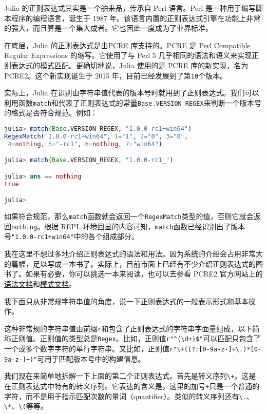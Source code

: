 Julia 的正则表达式其实是一个舶来品，传承自 Perl 语言。Perl 是一种用于编写脚本程序的编程语言，诞生于 1987 年。该语言内置的正则表达式引擎在功能上非常的强大，而且算是一个集大成者。它也因此一度成为了业界标准。

在底层，Julia 的正则表达式是由\href{https://www.pcre.org}{PCRE 库}支持的。PCRE 是 Perl Compatible Regular Expressions 的缩写。它使用了与 Perl 5 几乎相同的语法和语义来实现正则表达式的模式匹配。更确切地说，Julia 使用的是 PCRE 库的新实现，名为 PCRE2。这个新实现诞生于 2015 年，目前已经发展到了第\verb`10`个版本。

实际上，Julia 在识别由字符串值代表的版本号时就用到了正则表达式。我们可以利用函数\verb`match`和代表了正则表达式的常量\verb`Base.VERSION_REGEX`来判断一个版本号的格式是否符合规范。例如：
\begin{lstlisting}[language=julia]
julia> match(Base.VERSION_REGEX, "1.0.0-rc1+win64")
RegexMatch("1.0.0-rc1+win64", 1="1", 2="0", 3="0",
 4=nothing, 5="-rc1", 6=nothing, 7="win64")

julia> match(Base.VERSION_REGEX, "1.0.0-rc1_")

julia> ans == nothing
true

julia> 
\end{lstlisting}

如果符合规范，那么\verb`match`函数就会返回一个\verb`RegexMatch`类型的值，否则它就会返回\verb`nothing`。根据 REPL 环境回显的内容可知，\verb`match`函数已经识别出了版本号\verb`"1.0.0-rc1+win64"`中的各个组成部分。

我在这里不想过多地介绍正则表达式的语法和用法。因为系统的介绍会占用非常大的篇幅，足以写成一本书了。实际上，目前市面上已经有不少介绍正则表达式的图书了。如果有必要，你可以挑选一本来阅读，也可以去参看 PCRE2 官方网站上的\href{https://www.pcre.org/current/doc/html/pcre2syntax.html}{语法文档}和\href{https://www.pcre.org/current/doc/html/pcre2pattern.html}{模式文档}。

我下面只从非常规字符串值的角度，说一下正则表达式的一般表示形式和基本操作。

这种非常规的字符串值由前缀\verb`r`和包含了正则表达式的字符串字面量组成，以下简称正则值。正则值的类型总是\verb`Regex`。比如，正则值\verb`r"^(\d+)$"`可以匹配只包含了一个或多个数字字符的单行字符串。又比如，正则值\verb`r"\+((?:[0-9a-z-]+\.)*[0-9a-z-]+)"`可用于匹配版本号中的构建信息。

我们现在来简单地拆解一下上面的第二个正则表达式。首先是转义序列\verb`\+`。这是在正则表达式中特有的转义序列。它表达的含义是，这里的加号\verb`+`只是一个普通的字符，而不是用于指示匹配次数的量词（quantifier）。类似的转义序列还有\verb`\.`、\verb`\*`、\verb`\(`等等。

